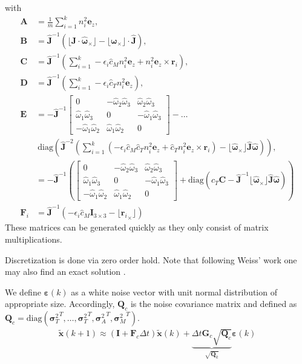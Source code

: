 \documentclass[10pt,a4paper]{article}
\newcommand{\skewsym}[1]{\lfloor #1 _\times \rfloor}
\newcommand{\angvel}{\boldsymbol{\omega}}
\newcommand{\kthrh}{\hat{c}_T}
\newcommand{\kmomh}{\hat{c}_M}
\newcommand{\Inertia}{\mathbf{J}}
\begin{document}
with
\begin{align}
\mathbf{A} &= \frac{1}{m} \sum_{i=1}^k n_i^2 \mathbf{e}_z , \label{eq:A}\\
\mathbf{B} &= \hat{\mathbf{J}}^{-1} \left( \skewsym{\hat{\Inertia} \cdot \hat{\angvel}} - \skewsym{\angvel} \cdot \hat{\Inertia} \right) ,\label{eq:B}\\
\mathbf{C} &= \hat{\Inertia}^{-1} \left( \sum_{i=1}^k -\epsilon_i \kmomh n_i^2 \mathbf{e}_z + n_i^2 \mathbf{e}_z \times \mathbf{r}_i \right) ,\label{eq:C}\\
\mathbf{D} &= \hat{\Inertia}^{-1} \left( \sum_{i=1}^k -\epsilon_i \kthrh n_i^2 \mathbf{e}_z  \right) ,\label{eq:D}\\
\mathbf{E} &= - \hat{\Inertia}^{-1} \begin{bmatrix}
0 & -\hat{\omega}_2\hat{\omega}_3 & \hat{\omega}_2\hat{\omega}_3 \\
\hat{\omega}_1\hat{\omega}_3 & 0 & -\hat{\omega}_1\hat{\omega}_3 \\
-\hat{\omega}_1\hat{\omega}_2 & \hat{\omega}_1\hat{\omega}_2 & 0
\end{bmatrix} - \ldots \\
&~ \mathrm{diag} \left( \hat{\Inertia}^{-2} \left( \sum_{i=1}^k \left( -\epsilon_i \kmomh \kthrh n_i^2 \mathbf{e}_z + \kthrh n_i^2 \mathbf{e}_z \times \mathbf{r}_i \right) - \skewsym{\hat{\angvel}} \hat{\Inertia} \hat{\angvel} \right) \right), \label{eq:E} \\
&= -\hat{\Inertia}^{-1} \left( \begin{bmatrix}
0 & -\hat{\omega}_2\hat{\omega}_3 & \hat{\omega}_2\hat{\omega}_3 \\
\hat{\omega}_1\hat{\omega}_3 & 0 & -\hat{\omega}_1\hat{\omega}_3 \\
-\hat{\omega}_1\hat{\omega}_2 & \hat{\omega}_1\hat{\omega}_2 & 0
\end{bmatrix} + \mathrm{diag} \left( \kthrh \mathbf{C} - \hat{\Inertia}^{-1} \skewsym{\hat{\angvel}} \hat{\Inertia} \hat{\angvel} \right) \right) \\
\mathbf{F}_i &= \hat{\Inertia}^{-1} \left( -\epsilon_i \kmomh \mathbf{I}_{3\times3} - \skewsym{{\mathbf{r}_i}} \right) 
\end{align}
These matrices can be generated quickly as they only consist of matrix multiplications.

Discretization is done via zero order hold. Note that following Weiss' work one may also find an exact solution \cite{weiss2012vision}. 

We define $\boldsymbol{\varepsilon}(k)$ as a white noise vector with unit normal distribution of appropriate size. Accordingly, $\mathbf{Q}_c$ is the noise covariance matrix and defined as $\mathbf{Q}_c = \mathrm{diag} ( {\boldsymbol{\sigma}_T^2}^T, \ldots , {\boldsymbol{\sigma}_T^2}^T, {\boldsymbol{\sigma}_A^2}^T, {\boldsymbol{\sigma}_M^2}^T  )$.
\begin{align}
\tilde{\mathbf{x}} (k+1) \approx (\mathbf{I} + \mathbf{F}_c \Delta t) \tilde{\mathbf{x}}(k) + \underbrace{\Delta t \mathbf{G}_c  \sqrt{\mathbf{Q}_c}}_{\sqrt{\mathbf{Q}_k}} \boldsymbol{\varepsilon}(k)
\end{align}
\end{document}
